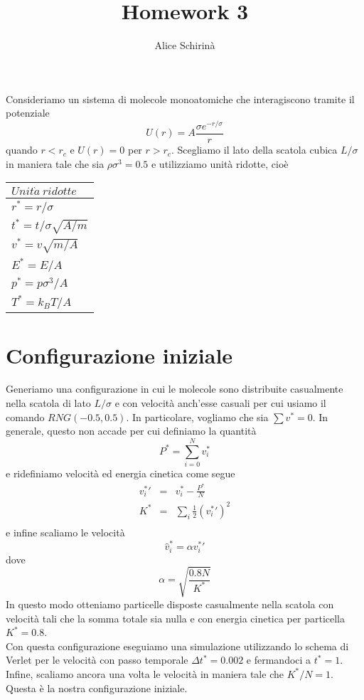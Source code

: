 \documentclass[a4paper,11pt]{article}
\begin{document}
\title{\sc Homework 3}
\author{\sc Alice Schirinà}
\maketitle

\noindent Consideriamo un sistema di molecole monoatomiche che interagiscono tramite il potenziale 
\begin{equation*}
U(r) = A \frac{\sigma e^{-r/\sigma}}{r}
\end{equation*}
quando $ r <r_c $ e $U(r) = 0$ per $ r >r_c $. Scegliamo il lato della scatola cubica $ L/\sigma $ in maniera tale che sia $\rho \sigma^3=0.5$ e utilizziamo unità ridotte, cioè
\begin{table}[H]
	\centering
	\begin{tabular}{l} 
		\hline
		 $Unit\grave{a}\ ridotte$ \\
		\hline
		$r^* = r/\sigma$	\\
		$t^* = t/\sigma \sqrt{A/m}$	\\
		$v^* = v\sqrt{m/A}$	\\
		$E^* = E/A$	\\
		$p^* = p \sigma^3/A$	\\
		$T^* = k_B T/A$	\\\hline
	\end{tabular}
\end{table}
\medskip
\noindent \section*{Configurazione iniziale}
Generiamo una configurazione in cui le molecole sono distribuite casualmente nella scatola di lato $ L/\sigma $ e con velocità anch'esse casuali per cui usiamo il comando $RNG(-0.5,0.5)$. In particolare, vogliamo che sia $\sum v^* = 0$. In generale, questo non accade per cui definiamo la quantità
\begin{equation*}
P^* = \sum_{i=0}^N v_i^*
\end{equation*}
e ridefiniamo velocità ed energia cinetica come segue
\begin{eqnarray*}
{v_i^*}' &=& v_i^* - \frac{P^*}{N}\\
K^* &=& \sum_i \frac{1}{2} ({v_i^*}')^2\\
\end{eqnarray*}
e infine scaliamo le velocità
\begin{equation*}
\hat{v}_i^* = \alpha {v_i^*}'
\end{equation*}
dove 
\begin{equation*}
\alpha = \sqrt{\frac{0.8N}{K^*}}
\end{equation*}
In questo modo otteniamo particelle disposte casualmente nella scatola con velocità tali che la somma totale sia nulla e con energia cinetica per particella $K^* = 0.8$.\\
Con questa configurazione eseguiamo una simulazione utilizzando lo schema di Verlet per le velocità con passo temporale $\Delta t^* = 0.002$ e fermandoci a $t^* = 1$. Infine, scaliamo ancora una volta le velocità in maniera tale che $K^*/N = 1$. Questa è la nostra configurazione iniziale.
\end{document}
